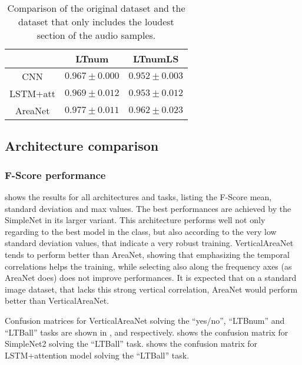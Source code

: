 \begin{table}[t!]
    \centering
    \caption{Comparison of the original dataset and the dataset that only
    includes the loudest section of the audio samples.}
    \label{tab:comparison_loud_section}
    \begin{tabular}{|c|c|c|}
        \hline
        & LTnum & LTnumLS \\
        \hline
        CNN      & $0.967 \pm 0.000$ & $0.952 \pm 0.003$ \\
        LSTM+att & $0.969 \pm 0.012$ & $0.953 \pm 0.012$ \\
        AreaNet  & $0.977 \pm 0.011$ & $0.962 \pm 0.023$ \\
        \hline
    \end{tabular}
\end{table}

\subsection{Architecture comparison}

\subsubsection{F-Score performance}

 shows the results for all architectures and tasks,
listing the F-Score mean, standard deviation and max values.
%
The best performances are achieved by the SimpleNet in its larger variant. This
architecture performs well not only regarding to the best model in the class,
but also according to the very low standard deviation values, that indicate a
very robust training.
%
VerticalAreaNet tends to perform better than AreaNet, showing that emphasizing
the temporal correlations helps the training, while selecting also along the
frequency axes (as AreaNet does) does not improve performances.
%
It is expected that on a standard image dataset, that lacks this strong
vertical correlation, AreaNet would perform better than VerticalAreaNet.


% 

Confusion matrices for VerticalAreaNet solving the ``yes/no'', ``LTBnum'' and
``LTBall'' tasks are shown in ,
 and
 respectively.
%
 shows the confusion
matrix for SimpleNet2 solving the ``LTBall'' task.
%
shows the confusion matrix for LSTM+attention model solving the ``LTBall''
task.

